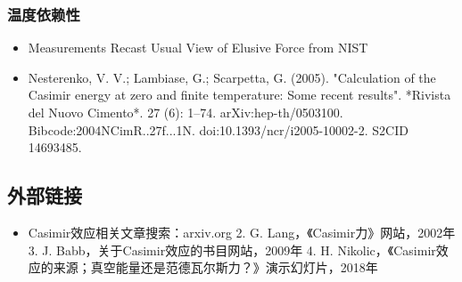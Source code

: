 \subsubsection{温度依赖性}
\begin{itemize}
\item Measurements Recast Usual View of Elusive Force from NIST 
\item Nesterenko, V. V.; Lambiase, G.; Scarpetta, G. (2005). "Calculation of the Casimir energy at zero and finite temperature: Some recent results". *Rivista del Nuovo Cimento*. 27 (6): 1–74. arXiv:hep-th/0503100. Bibcode:2004NCimR..27f...1N. doi:10.1393/ncr/i2005-10002-2. S2CID 14693485.
\end{itemize}
\subsection{外部链接}
\begin{itemize}
\item Casimir效应相关文章搜索：arxiv.org
2. G. Lang，《Casimir力》网站，2002年
3. J. Babb，关于Casimir效应的书目网站，2009年
4. H. Nikolic，《Casimir效应的来源；真空能量还是范德瓦尔斯力？》演示幻灯片，2018年
\end{itemize}